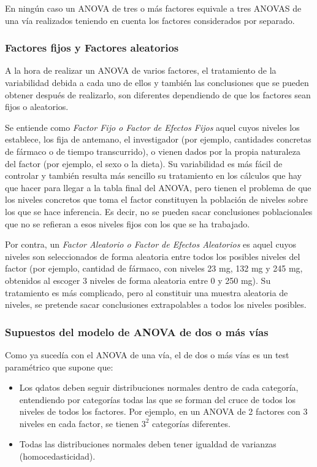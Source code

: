 En ningún caso un ANOVA de tres o más factores equivale a tres ANOVAS de una vía realizados teniendo en cuenta los
factores considerados por separado.


\subsubsection{Factores fijos y Factores aleatorios}
A la hora de realizar un ANOVA de varios factores, el tratamiento de la variabilidad debida a cada uno de ellos y
también las conclusiones que se pueden obtener después de realizarlo, son diferentes dependiendo de que los factores
sean fijos o aleatorios.

Se entiende como \emph{Factor Fijo o Factor de Efectos Fijos} aquel cuyos niveles los establece, los fija de antemano,
el investigador (por ejemplo, cantidades concretas de fármaco o de tiempo transcurrido), o vienen dados por la propia
naturaleza del factor (por ejemplo, el sexo o la dieta). Su variabilidad es más fácil de controlar y también resulta más
sencillo su tratamiento en los cálculos que hay que hacer para llegar a la tabla final del ANOVA, pero tienen el
problema de que los niveles concretos que toma el factor constituyen la población de niveles sobre los que se hace
inferencia. Es decir, no se pueden sacar conclusiones poblacionales que no se refieran a esos niveles fijos con los que
se ha trabajado.

Por contra, un \emph{Factor Aleatorio o Factor de Efectos Aleatorios} es aquel cuyos niveles son seleccionados de forma
aleatoria entre todos los posibles niveles del factor (por ejemplo, cantidad de fármaco, con niveles 23 mg, 132 mg y 245
mg, obtenidos al escoger 3 niveles de forma aleatoria entre 0 y 250 mg). Su tratamiento es más complicado, pero al
constituir una muestra aleatoria de niveles, se pretende sacar conclusiones extrapolables a todos los niveles posibles.


\subsubsection{Supuestos del modelo de ANOVA de dos o más vías}
Como ya sucedía con el ANOVA de una vía, el de dos o más vías es un test paramétrico que supone que:
\begin{itemize}
\item Los qdatos deben seguir distribuciones normales dentro de cada categoría, entendiendo por categorías todas las que
se forman del cruce de todos los niveles de todos los factores. Por ejemplo, en un ANOVA de 2 factores con 3 niveles en
cada factor, se tienen $3^2$ categorías diferentes.
\item Todas las distribuciones normales deben tener igualdad de varianzas (homocedasticidad).
\end{itemize}

